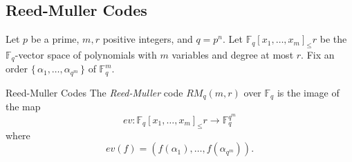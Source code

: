 \subsection{Reed-Muller Codes}
\begin{frame}

    Let $p$ be a prime, $m,r$ positive integers, and $q = p^n$. Let $\mathbb{F}_q[x_1, \dots, x_m]_\leq r$ be the $\mathbb{F}_q$-vector space of polynomials with $m$ variables and degree at most $r$. Fix an order $\{\, \alpha_1, \dots, \alpha_{q^m} \,\}$ of $\mathbb{F}_q^m$.

    \begin{block}{Reed-Muller Codes}
        The \textit{Reed-Muller} code $RM_q(m, r)$ over $\mathbb{F}_q$ is the image of the map
        \[
        ev:\mathbb{F}_q[x_1, \dots, x_m]_\leq r \xrightarrow{} \mathbb{F}_q^{q^m}
        \]
        where
        \[
        ev(f) = (f(\alpha_1), \dots, f(\alpha_{q^m})).
        \]
    \end{block}

    
    
\end{frame}


